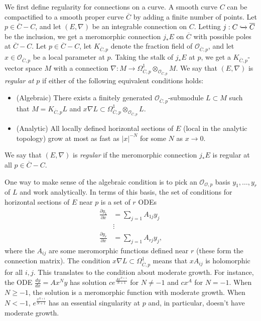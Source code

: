 \documentclass[leqno, openany]{memoir}
\theoremstyle{definition}
\theoremstyle{remark}
\theoremstyle{plain}
\theoremstyle{definition}
\theoremstyle{remark}
\begin{document}
We first define regularity for connections on a curve. A smooth curve $C$ can be compactified to a smooth proper curve $\overline{C}$ by adding a finite number of points. Let $p \in \overline{C} - C$, and let $(E,\nabla)$ be an integrable connection on $C$. Letting $j: C \xhookrightarrow{} \overline{C}$ be the inclusion, we get a meromorphic connection $j_*E$ on $\overline{C}$ with possible poles at $\overline{C} - C$. Let $p \in \overline{C} - C$, let $K_{\overline{C},p}$ denote the fraction field of $\mathcal{O}_{\overline{C},p}$, and let $x \in \mathcal{O}_{\overline{C},p}$ be a local parameter at $p$. Taking the stalk of $j_*E$ at $p$, we get a $K_{\overline{C},p}$-vector space $M$ with a connection $\nabla: M \to \Omega_{\overline{C},p}^1 \otimes_{\mathcal{O}_{\overline{C},p}} M$. We say that $(E,\nabla)$ is \textit{regular at $p$} if either of the following equivalent conditions holds: \begin{itemize}
\item (Algebraic) There exists a finitely generated $\mathcal{O}_{\overline{C},p}$-submodule $L \subset M$ such that $M = K_{\overline{C},p}L$ and $x\nabla L \subset \Omega_{\overline{C},p}^1 \otimes_{\mathcal{O}_{\overline{C},p}} L$.

\item (Analytic) All locally defined horizontal sections of $E$ (local in the analytic topology) grow at most as fast as $|x|^{-N}$ for some $N$ as $x \to 0$.

\end{itemize}
We say that $(E,\nabla)$ is \textit{regular} if the meromorphic connection $j_*E$ is regular at all $p \in \overline{C} - C$.

One way to make sense of the algebraic condition is to pick an $\mathcal{O}_{\mathcal{O},p}$ basis $y_1,\ldots,y_r$ of $L$ and work analytically. In terms of this basis, the set of conditions for horizontal sections of $E$ near $p$ is a set of $r$ ODEs \begin{align*}
\frac{\partial y_1}{\partial x} &= \sum_{j = 1}A_{1j}y_j \\
&\vdots \\
\frac{\partial y_r}{\partial x} &= \sum_{j = 1}A_{rj}y_j,
\end{align*}
where the $A_{ij}$ are some meromorphic functions defined near $r$ (these form the connection matrix). The condition $x\nabla L \subset \Omega_{\overline{C},p}^1$ means that $xA_{ij}$ is holomorphic for all $i,j$. This translates to the condition about moderate growth. For instance, the ODE $\frac{dy}{dx} = Ax^Ny$ has solution $ce^{\frac{Ax^{N + 1}}{N + 1}}$ for $N \ne -1$ and $cx^A$ for $N = -1$. When $N \ge -1$, the solution is a meromorphic function with moderate growth. When $N < -1$, $e^{\frac{x^{N + 1}}{N + 1}}$ has an essential singularity at $p$ and, in particular, doesn't have moderate growth.
\end{document}
